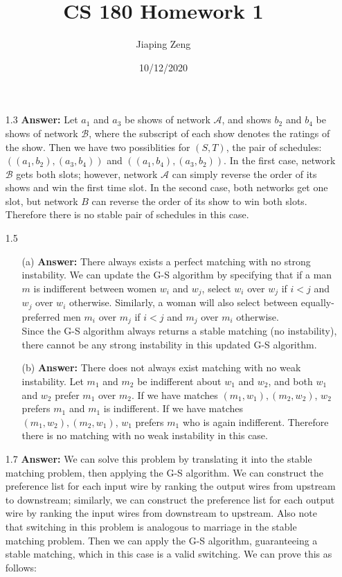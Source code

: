 \documentclass{article}
\title{CS 180 Homework 1}
\date{10/12/2020}
\author{Jiaping Zeng}
\begin{document}

\begin{itemize}
      \item [1.3]
            \textbf{Answer:} Let $a_1$ and $a_3$ be shows of network $\mathcal{A}$, and shows $b_2$ and $b_4$ be shows of network $\mathcal{B}$, where the subscript of each show denotes the ratings of the show. Then we have two possiblities for $(S,T)$, the pair of schedules: $((a_1,b_2),(a_3,b_4))$ and $((a_1,b_4),(a_3,b_2))$. In the first case, network $\mathcal{B}$ gets both slots; however, network $\mathcal{A}$ can simply reverse the order of its shows and win the first time slot. In the second case, both networks get one slot, but network $B$ can reverse the order of its show to win both slots. Therefore there is no stable pair of schedules in this case.
      \item [1.5]
            \begin{itemize}
                  \item [(a)] \textbf{Answer:} There always exists a perfect matching with no strong instability. We can update the G-S algorithm by specifying that if a man $m$ is indifferent between women $w_i$ and $w_j$, select $w_i$ over $w_j$ if $i<j$ and $w_j$ over $w_i$ otherwise. Similarly, a woman will also select between equally-preferred men $m_i$ over $m_j$ if $i<j$ and $m_j$ over $m_i$ otherwise.\\Since the G-S algorithm always returns a stable matching (no instability), there cannot be any strong instability in this updated G-S algorithm.
                  \item [(b)] \textbf{Answer:} There does not always exist matching with no weak instability. Let $m_1$ and $m_2$ be indifferent about $w_1$ and $w_2$, and both $w_1$ and $w_2$ prefer $m_1$ over $m_2$. If we have matches $(m_1,w_1),(m_2,w_2)$, $w_2$ prefers $m_1$ and $m_1$ is indifferent. If we have matches $(m_1,w_2),(m_2,w_1)$, $w_1$ prefers $m_1$ who is again indifferent. Therefore there is no matching with no weak instability in this case.
            \end{itemize}
      \item [1.7]
            \textbf{Answer:} We can solve this problem by translating it into the stable matching problem, then applying the G-S algorithm. We can construct the preference list for each input wire by ranking the output wires from upstream to downstream; similarly, we can construct the preference list for each output wire by ranking the input wires from downstream to upstream. Also note that switching in this problem is analogous to marriage in the stable matching problem. Then we can apply the G-S algorithm, guaranteeing a stable matching, which in this case is a valid switching. We can prove this as follows:\\

\end{itemize}
\end{document}
